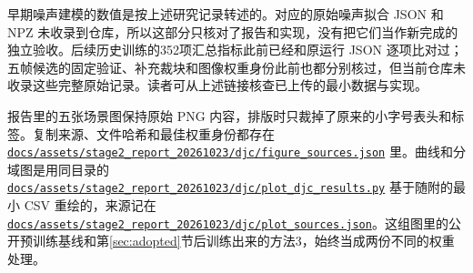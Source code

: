 \documentclass[11pt,a4paper,UTF8,fontset=fandol]{ctexart}
\newcommand{\repofile}[1]{\href{https://github.com/JingZe-Liang/SigmaStar_AIISP/blob/main/Stage2/9_19-10_1/Task3/XWJ/RECOVERED_Stage2_DenoiseModel_20261010/#1}{\nolinkurl{#1}}}
\begin{document}
早期噪声建模的数值是按上述研究记录转述的。对应的原始噪声拟合 JSON 和 NPZ 未收录到仓库，所以这部分只核对了报告和实现，没有把它们当作新完成的独立验收。后续历史训练的352项汇总指标此前已经和原运行 JSON 逐项比对过；五帧候选的固定验证、补充裁块和图像权重身份此前也都分别核过，但当前仓库未收录这些完整原始记录。读者可从上述链接核查已上传的最小数据与实现。

报告里的五张场景图保持原始 PNG 内容，排版时只裁掉了原来的小字号表头和标签。复制来源、文件哈希和最佳权重身份都存在 \repofile{docs/assets/stage2_report_20261023/djc/figure_sources.json} 里。曲线和分域图是用同目录的 \repofile{docs/assets/stage2_report_20261023/djc/plot_djc_results.py} 基于随附的最小 CSV 重绘的，来源记在 \repofile{docs/assets/stage2_report_20261023/djc/plot_sources.json}。这组图里的公开预训练基线和第\ref{sec:adopted}节后训练出来的方法3，始终当成两份不同的权重处理。
\end{document}
